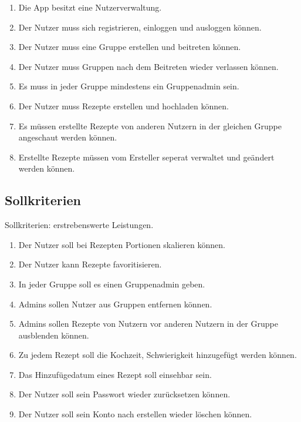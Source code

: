 \documentclass[parskip=full]{scrartcl}
\begin{document}
\begin{enumerate}[start=1,label={$\langle$\bfseries RM\arabic*$\rangle$}, leftmargin = 5em, itemsep=4pt, parsep=4pt]
    \item Die App besitzt eine Nutzerverwaltung.
    \item Der Nutzer muss sich registrieren, einloggen und ausloggen können.
    \item Der Nutzer muss eine Gruppe erstellen und beitreten können.
    \item Der Nutzer muss Gruppen nach dem Beitreten wieder verlassen können.
    \item Es muss in jeder Gruppe mindestens ein Gruppenadmin sein.
    \item Der Nutzer muss Rezepte erstellen und hochladen können.
    \item Es müssen erstellte Rezepte von anderen Nutzern in der gleichen Gruppe angeschaut werden können.
    \item Erstellte Rezepte müssen vom Ersteller seperat verwaltet und geändert werden können.
    
   
\end{enumerate}

\subsection{Sollkriterien}
Sollkriterien: erstrebenswerte Leistungen.

\begin{enumerate}[start=1,label={$\langle$\bfseries RS\arabic*$\rangle$}, leftmargin = 5em, itemsep=4pt, parsep=4pt]
    
    \item Der Nutzer soll bei Rezepten Portionen skalieren können.
    \item Der Nutzer kann Rezepte favoritisieren.
    \item In jeder Gruppe soll es einen Gruppenadmin geben.
    \item Admins sollen Nutzer aus Gruppen entfernen können.
    \item Admins sollen Rezepte von Nutzern vor anderen Nutzern in der Gruppe ausblenden können.
    \item Zu jedem Rezept soll die Kochzeit, Schwierigkeit hinzugefügt werden können.
    \item Das Hinzufügedatum eines Rezept soll einsehbar sein.
    \item Der Nutzer soll sein Passwort wieder zurücksetzen können.
    \item Der Nutzer soll sein Konto nach erstellen wieder löschen können.
    
\end{enumerate}
\end{document}

